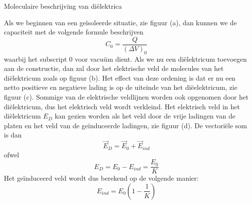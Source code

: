\begin{app}{Moleculaire beschrijving van diëlektrica}
    \vspace{-0.5cm}
    \begin{minipage}{.75\textwidth}
        Als we beginnen van een geïsoleerde situatie, zie figuur (a), dan kunnen we de capaciteit met de volgende formule beschrijven
        \begin{equation*}
            C_0 = \dfrac{Q}{(\Delta V)_0}
        \end{equation*}
        \noindent waarbij het subscript $0$ voor vacuüm dient. Als we nu een diëlektricum toevoegen aan de constructie, dan zal door het elektrische veld de molecules van het diëlektricum zoals op figuur (b). Het effect van deze ordening is dat er nu een netto positieve en negatieve lading is op de uiteinde van het diëelektricum, zie figuur (c). Sommige van de elektrische veldlijnen worden ook opgenomen door het diëlektricum, dus het elektrisch veld wordt verkleind. Het elektrisch veld in het diëlektricum $E_D$ kan gezien worden als het veld door de vrije ladingen van de platen en het veld van de geïnduceerde ladingen, zie figuur (d). De vectoriële som is dan
        \begin{equation*}
            \Vec{E}_D = \Vec{E}_0 + \Vec{E}_{ind}
        \end{equation*}
        ofwel
        \begin{equation*}
            E_D = E_0 - E_{ind} = \dfrac{E_0}{K}
        \end{equation*}
        Het geïnduceerd veld wordt dus berekend op de volgende manier:
        \begin{equation*}
            E_{ind} = E_0\left(1-\dfrac{1}{K}\right)
        \end{equation*}
    \end{minipage}
    \hspace{0.5cm}
    \begin{minipage}{.18\textwidth}

\end{minipage}
\end{app}
